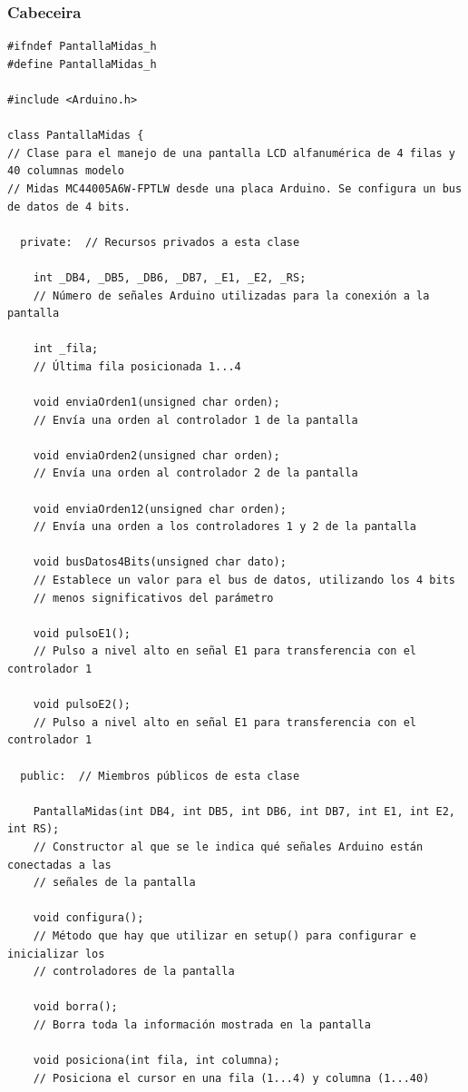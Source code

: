 \documentclass[11pt,twoside]{book}
\begin{document}
\subsubsection{Cabeceira}
\begin{lstlisting}
#ifndef PantallaMidas_h
#define PantallaMidas_h

#include <Arduino.h>

class PantallaMidas {
// Clase para el manejo de una pantalla LCD alfanumérica de 4 filas y 40 columnas modelo
// Midas MC44005A6W-FPTLW desde una placa Arduino. Se configura un bus de datos de 4 bits. 

  private:  // Recursos privados a esta clase
  
    int _DB4, _DB5, _DB6, _DB7, _E1, _E2, _RS;
    // Número de señales Arduino utilizadas para la conexión a la pantalla
    
    int _fila;  
    // Última fila posicionada 1...4
    
    void enviaOrden1(unsigned char orden);
    // Envía una orden al controlador 1 de la pantalla
    
    void enviaOrden2(unsigned char orden);
    // Envía una orden al controlador 2 de la pantalla
    
    void enviaOrden12(unsigned char orden);
    // Envía una orden a los controladores 1 y 2 de la pantalla
    
    void busDatos4Bits(unsigned char dato);
    // Establece un valor para el bus de datos, utilizando los 4 bits
    // menos significativos del parámetro
    
    void pulsoE1();
    // Pulso a nivel alto en señal E1 para transferencia con el controlador 1
    
    void pulsoE2();
    // Pulso a nivel alto en señal E1 para transferencia con el controlador 1

  public:  // Miembros públicos de esta clase
  
    PantallaMidas(int DB4, int DB5, int DB6, int DB7, int E1, int E2, int RS);
    // Constructor al que se le indica qué señales Arduino están conectadas a las 
    // señales de la pantalla
    
    void configura();
    // Método que hay que utilizar en setup() para configurar e inicializar los 
    // controladores de la pantalla
    
    void borra();
    // Borra toda la información mostrada en la pantalla
    
    void posiciona(int fila, int columna);
    // Posiciona el cursor en una fila (1...4) y columna (1...40)
    

\end{lstlisting}
\end{document}
